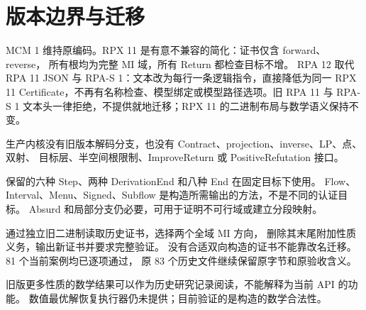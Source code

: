 \chapter{版本边界与迁移}
\label{app:revisions}

MCM 1 维持原编码。RPX 11 是有意不兼容的简化：证书仅含 forward、reverse，
所有根均为完整 MI 域，所有 Return 都检查目标不增。
RPA 12 取代 RPA 11 JSON 与 RPA-S 1：文本改为每行一条逻辑指令，直接降低为同一
RPX 11 Certificate，不再有名称检查、模型绑定或模型路径选项。旧 RPA 11 与
RPA-S 1 文本头一律拒绝，不提供就地迁移；RPX 11 的二进制布局与数学语义保持不变。

生产内核没有旧版本解码分支，也没有 Contract、projection、inverse、LP、点、双射、
目标层、半空间根限制、ImproveReturn 或 PositiveRefutation 接口。

保留的六种 Step、两种 DerivationEnd 和八种 End 在固定目标下使用。
Flow、Interval、Menu、Signed、Subflow 是构造所需输出的方法，不是不同的认证目标。
Absurd 和局部分支仍必要，可用于证明不可行域或建立分段映射。

 通过独立旧二进制读取历史证书，选择两个全域 MI 方向，
删除其末尾附加性质义务，输出新证书并要求完整验证。
没有合适双向构造的证书不能靠改名迁移。81 个当前案例均已逐项通过，
原 83 个历史文件继续保留原字节和原验收含义。

旧版更多性质的数学结果可以作为历史研究记录阅读，不能解释为当前 API 的功能。
数值最优解恢复执行器仍未提供；目前验证的是构造的数学合法性。
